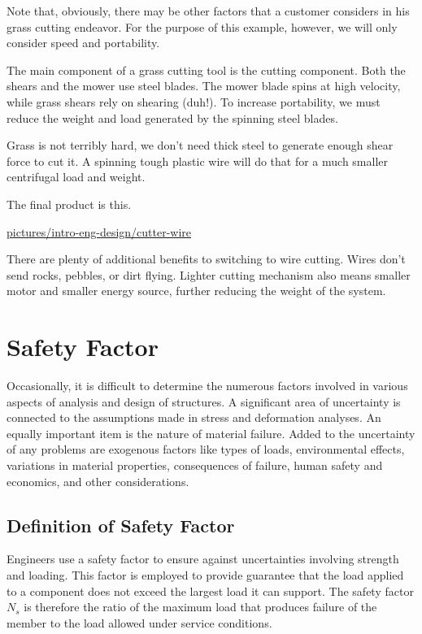 \documentclass[a4paper,openany,12pt]{book}
\begin{document}
Note that, obviously, there may be other factors that a customer
considers in his grass cutting endeavor. For the purpose of this
example, however, we will only consider speed and portability.

The main component of a grass cutting tool is the cutting component.
Both the shears and the mower use steel blades. The mower blade spins at
high velocity, while grass shears rely on shearing (duh!). To increase
portability, we must reduce the weight and load generated by the
spinning steel blades.

Grass is not terribly hard, we don't need thick steel to generate enough
shear force to cut it. A spinning tough plastic wire will do that for a
much smaller centrifugal load and weight.

The final product is this.


\url{pictures/intro-eng-design/cutter-wire}

There are plenty of additional benefits to switching to wire cutting.
Wires don't send rocks, pebbles, or dirt flying. Lighter cutting
mechanism also means smaller motor and smaller energy source, further
reducing the weight of the system.

\section{Safety Factor}
\label{safety-factor}
Occasionally, it is difficult to determine the numerous factors involved
in various aspects of analysis and design of structures. A significant
area of uncertainty is connected to the assumptions made in stress and
deformation analyses. An equally important item is the nature of
material failure. Added to the uncertainty of any problems are exogenous
factors like types of loads, environmental effects, variations in
material properties, consequences of failure, human safety and
economics, and other considerations.

\subsection{Definition of Safety Factor}
\label{definition-of-safety-factor}
Engineers use a safety factor to ensure against uncertainties involving
strength and loading. This factor is employed to provide guarantee that
the load applied to a component does not exceed the largest load it can
support. The safety factor \(N_s\) is therefore the ratio of the maximum
load that produces failure of the member to the load allowed under
service conditions.
\end{document}
